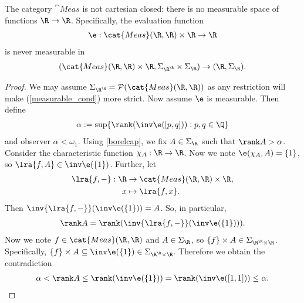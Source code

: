 \documentclass{article}
\begin{document}
\begin{theorem}[Aumann, 1961]
	The category $\cat{Meas}$ is not cartesian closed: there is no measurable space of functions $\R\to\R$.
	Specifically, the evaluation function
	\begin{align*}
		\e : \cat{Meas}(\R,\R) \times \R \to \R
	\end{align*}
	is never measurable in
	\begin{align*}
		(\cat{Meas}(\R,\R)\times\R,\Sigma_{\R^\R}\times \Sigma_\R) \to (\R, \Sigma_\R).
	\end{align*}
	\begin{proof}
		We may assume $\Sigma_{\R^\R}=\mathcal{P}(\cat{Meas}(\R,\R))$ as any restriction will make
		(\ref{measurable_cond}) more strict.
		Now assume $\e$ is measurable. Then define
		\begin{align*}
			\alpha := \sup\{\rank(\inv\e([p,q])):p,q\in\Q\}
		\end{align*}
		and observer $\alpha<\omega_1$.
		Using \ref{borelcap}, we fix $A\in \Sigma_\R$ such that $\rank A>\alpha$.
		Consider the characteristic function $\chi_A:\R\to\R$. Now we note
		$\e(\chi_A,A)=\{1\}$, so $\lra{f,A}\in\inv\e(\{1\})$. Further, let
		\begin{align*}
			\lra{f,-}:\R & \to\cat{Meas}(\R,\R)\times\R, \\
			x            & \mapsto \lra{f,x}.
		\end{align*}
		Then $\inv{\lra{f,-}}(\inv\e(\{1\}))=A$. So, in particular,
		\begin{align*}
			\rank A = \rank(\inv{\lra{f,-}}(\inv\e(\{1\}))).
		\end{align*}
		Now we note $f\in\cat{Meas}(\R,\R)$ and $A\in \Sigma_\R$, so $\{f\}\times A\in \Sigma_{\R^\R\times\R}$.
		Specifically, $\{f\}\times A\subseteq\inv\e(\{1\})\in \Sigma_{\R^\R\times\R}$. Therefore
		we obtain the contradiction
		\begin{align*}
			\alpha<\rank A \leq \rank(\inv\e(\{1\}))=\rank(\inv\e([1,1]))\leq \alpha.
		\end{align*}

	\end{proof}
\end{theorem}
\end{document}
